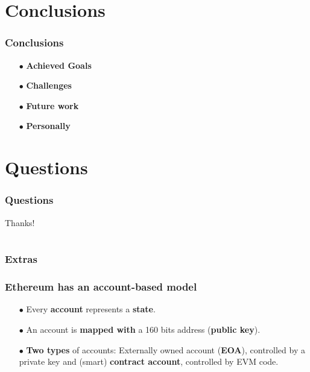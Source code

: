 \documentclass{beamer}
\begin{document}

\section{Conclusions}

\begin{frame}
\frametitle{Conclusions}
\begin{itemize}
	\item[$\bullet$]  \textbf{Achieved Goals}
	\item[$\bullet$]  \textbf{Challenges}
	\item[$\bullet$]  \textbf{Future work}
	\item[$\bullet$]  \textbf{Personally}
\end{itemize}
\end{frame}


\section{Questions}

\begin{frame}
\frametitle{Questions}

\Huge{\centerline{Thanks!}}
\end{frame}



\section{}

\begin{frame}
	\frametitle{Extras}
	
\end{frame}

\begin{frame}
	\frametitle{Ethereum has an account-based model}
	\begin{itemize}
		\item[$\bullet$] Every \textbf{account} represents a \textbf{state}.
		\item[$\bullet$] An account is \textbf{mapped with} a 160 bits address (\textbf{public key}).
		\item[$\bullet$] \textbf{Two types} of accounts: Externally owned account (\textbf{EOA}), controlled by a private key and (smart) \textbf{contract account}, controlled by EVM code.
	\end{itemize}
\end{frame}
\end{document}
